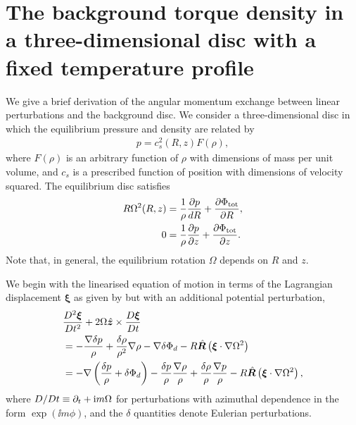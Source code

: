 \section{The background torque density in a three-dimensional disc with
  a fixed temperature profile}\label{tbg_deriv}
We give a brief derivation of the angular momentum exchange between
linear perturbations and the background disc. We consider a
three-dimensional disc in which the equilibrium pressure and density
are related by 
\begin{align}\label{iso_cond}
  p = c_s^2(R,z)F(\rho),
\end{align} 
where $F(\rho)$ is an arbitrary function of $\rho$ with dimensions of
mass per unit volume, and $c_s$ is a prescribed function of
position with dimensions of velocity squared. The equilibrium disc
satisfies 
\begin{align}
  R\Omega^2(R,z) &= \frac{1}{\rho}\frac{\partial p}{d R} +
  \frac{\partial\Phi_\mathrm{tot}}{\partial R}, \\
  0 &= \frac{1}{\rho}\frac{\partial p}{\partial z} + \frac{\partial\Phi_\mathrm{tot}}{\partial
    z}. 
\end{align}
Note that, in general, the equilibrium rotation $\Omega$ depends on
$R$ and $z$. 

We begin with the linearised equation of motion in terms of the
Lagrangian displacement $\bm{\xi}$ as given by \cite{lin93b} but with an
additional potential perturbation, 
\begin{align}\label{lagragian_pert}
  &\frac{D^2\bm{\xi}}{Dt^2} +
  2\Omega\hat{\bm{z}}\times\frac{D\bm{\xi}}{Dt}  \notag \\ &= -
  \frac{\nabla \delta p }{\rho} + \frac{\delta\rho}{\rho^2}\nabla\rho  
  -\nabla\delta\Phi_d - R
  \hat{\bm{R}}\left(\bm{\xi}\cdot\nabla\Omega^2\right) \notag \\
  & = -\nabla\left(\frac{\delta p}{\rho} + \delta \Phi_d\right) -
  \frac{\delta p}{\rho}\frac{\nabla\rho}{\rho} +
  \frac{\delta\rho}{\rho}\frac{\nabla p}{\rho} -  R
  \hat{\bm{R}}\left(\bm{\xi}\cdot\nabla\Omega^2\right),
\end{align}
where $D/Dt \equiv \partial_t + \mathrm{i} m \Omega$ for perturbations with
azimuthal dependence in the form $\exp\left(\ii m \phi\right)$, and  
the $\delta$ quantities denote Eulerian perturbations. 

